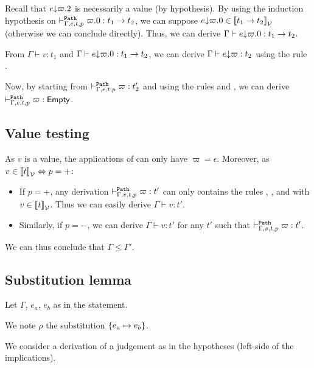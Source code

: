 \documentclass[a4paper]{article}
\theoremstyle{definition}
\begin{document}
\begin{description}
          Recall that $\occ e {\varpi.2}$ is necessarily a value (by hypothesis).
          By using the induction hypothesis on $\pvdash \Gamma p e t \varpi.0:\arrow {t_1} {t_2}$, we can suppose $\occ e {\varpi.0} \in \valsemantic{\arrow {t_1} {t_2}}$ (otherwise we can conclude directly).
          Thus, we can derive $\Gamma \vdash \occ e {\varpi.0}: \arrow {t_1} {t_2}$.

          From $\Gamma \vdash v:t_1$ and $\Gamma \vdash \occ e {\varpi.0}: \arrow {t_1} {t_2}$, we can derive $\Gamma \vdash \occ e {\varpi}: t_2$
          using the rule .

          Now, by starting from $\pvdash \Gamma p e t \varpi:t_2'$ and using the rules  and , we can derive
          $\pvdash \Gamma p e t \varpi:\Empty$.
        \end{description}

        \subsection{Value testing}

        As $v$ is a value, the applications of  can only have $\varpi=\epsilon$.
        Moreover, as $v \in \valsemantic{t} \Leftrightarrow p=+$:
        \begin{itemize}
          \item If $p=+$, any derivation $\pvdash \Gamma p v t \varpi:t'$ can only contains the rules , , 
          and  with $v \in \valsemantic{t}$. Thus we can easily derive $\Gamma \vdash v:t'$.
          \item Similarly, if $p=-$, we can derive $\Gamma \vdash v:t'$ for any $t'$ such that $\pvdash \Gamma p v t \varpi:t'$.
        \end{itemize}
        We can thus conclude that $\Gamma \leq \Gamma'$.

        \subsection{Substitution lemma}

        Let $\Gamma$, $e_a$, $e_b$ as in the statement.

        We note $\rho$ the substitution $\subst {e_a} {e_b}$.

        We consider a derivation of a judgement as in the hypotheses (left-side of the implications).
\end{document}
